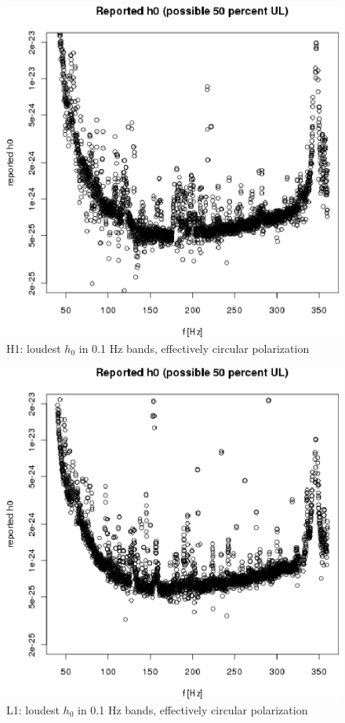 \begin{figure}
\begin{center}
\includegraphics[width=0.5\paperwidth,height=0.35\paperheight]{plots/h0FullUL50log-H1.eps}
\caption{
H1: loudest $h_0$ in 0.1 Hz bands, effectively circular polarization}
\end{center}
\end{figure}

\begin{figure}
\begin{center}
\includegraphics[width=0.5\paperwidth,height=0.35\paperheight]{plots/h0FullUL50log-L1.eps}
\caption{
L1: loudest $h_0$ in 0.1 Hz bands, effectively circular polarization}
\end{center}
\end{figure}
